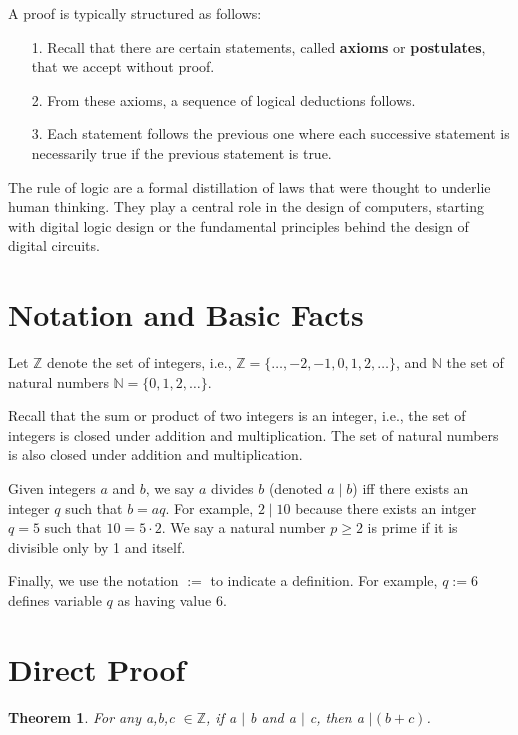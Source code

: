 \documentclass[12pt,a4paper]{article}
\newtheorem{theorem}{Theorem}[section]
\theoremstyle{definition}
\begin{document}
\bigbreak

A proof is typically structured as follows:
\begin{itemize}
	\item[1.] Recall that there are certain statements, called \textbf{axioms} or \textbf{postulates}, that we accept without proof.
	\item[2.] From these axioms, a sequence of logical deductions follows.
	\item[3.] Each statement follows the previous one where each successive statement is necessarily true if the previous statement is true.
\end{itemize}

The rule of logic are a formal distillation of laws that were thought to underlie human thinking. They play a central role in the design of computers, starting with digital logic design or the fundamental principles behind the design of digital circuits.

\section*{Notation and Basic Facts}

Let $\mathbb{Z}$ denote the set of integers, i.e., $\mathbb{Z}=\{\dots,-2,-1,0,1,2,\dots\}$, and $\mathbb{N}$ the set of natural numbers $\mathbb{N}=\{0,1,2,\dots\}$.

\bigbreak

Recall that the sum or product of two integers is an integer, i.e., the set of integers is closed under addition and multiplication. The set of natural numbers is also closed under addition and multiplication.

\bigbreak

Given integers $a$ and $b$, we say $a$ divides $b$ (denoted $a\mid b$) iff there exists an integer $q$ such that $b=aq$. For example, $2\mid 10$ because there exists an intger $q=5$ such that $10=5\cdot 2$. We say a natural number $p\geq 2$ is prime if it is divisible only by 1 and itself.

\bigbreak

Finally, we use the notation $:=$ to indicate a definition. For example, $q:=6$ defines variable $q$ as having value 6.

\section*{Direct Proof}

\begin{theorem}\label{thm2.1}
For any a,b,c $\in\mathbb{Z}$, if a $\mid$ b and a $\mid$ c, then a $\mid(b+c)$.
\end{theorem}
\end{document}
